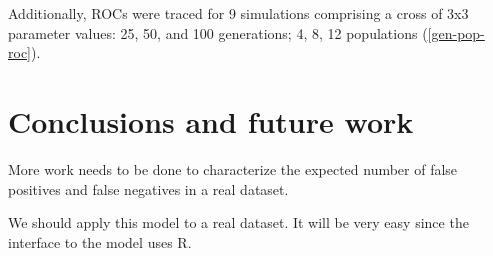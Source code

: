 \documentclass[a4paper,12pt]{article}
\begin{document}
Additionally, ROCs were traced for 9 simulations comprising a cross of
3x3 parameter values: 25, 50, and 100 generations; 4, 8, 12
populations (\autoref{gen-pop-roc}).


\section{Conclusions and future work}

More work needs to be done to characterize the expected number of
false positives and false negatives in a real dataset.

We should apply this model to a real dataset. It will be very easy
since the interface to the model uses R.



\end{document}
